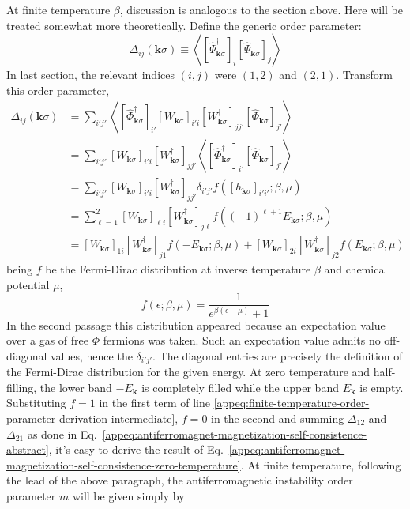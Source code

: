 At finite temperature $\beta$, discussion is analogous to the section above. Here will be treated somewhat more theoretically. Define the generic order parameter:
\[
	\Delta_{ij} (\mathbf{k}\sigma) \equiv \left\langle
		[
			\hat \Psi_{\mathbf{k}\sigma}^\dagger
		]_i [
			\hat \Psi_{\mathbf{k}\sigma}
		]_j
	\right\rangle
\]
In last section, the relevant indices $(i,j)$ were $(1,2)$ and $(2,1)$. Transform this order parameter,
\begin{align}
	\Delta_{ij} (\mathbf{k}\sigma) &= \sum_{i'j'} \left\langle
		[
			\hat \Phi_{\mathbf{k}\sigma}^\dagger
		]_{i'} 
		[
			W_{\mathbf{k}\sigma}
		]_{i'i} [
			W_{\mathbf{k}\sigma}^\dagger
		]_{jj'}
		[
			\hat \Phi_{\mathbf{k}\sigma}
		]_{j'}
	\right\rangle \nonumber \\
	&= 
	\sum_{i'j'} [
		W_{\mathbf{k}\sigma}
	]_{i'i} [
		W_{\mathbf{k}\sigma}^\dagger
	]_{jj'}
	\left\langle
		[
			\hat \Phi_{\mathbf{k}\sigma}^\dagger
		]_{i'} 
		[
			\hat \Phi_{\mathbf{k}\sigma}
		]_{j'}
	\right\rangle \nonumber \\
	&= 
	\sum_{i'j'} [
		W_{\mathbf{k}\sigma}
	]_{i'i} [
		W_{\mathbf{k}\sigma}^\dagger
	]_{jj'}
	\delta_{i'j'} f\left(
		[h_{\mathbf{k}\sigma}]_{i'i'}; \beta,\mu
	\right) \nonumber \\
	&= 
	\sum_{\ell=1}^2 [
		W_{\mathbf{k}\sigma}
	]_{\ell i} [
		W_{\mathbf{k}\sigma}^\dagger
	]_{j\ell}
	f\left(
		(-1)^{\ell+1} E_{\mathbf{k}\sigma}; \beta,\mu
	\right) \nonumber \\
	&= 
	[
		W_{\mathbf{k}\sigma}
	]_{1 i} [
		W_{\mathbf{k}\sigma}^\dagger
	]_{j 1} f\left(
		-E_{\mathbf{k}\sigma}; \beta,\mu
	\right) + [
		W_{\mathbf{k}\sigma}
	]_{2 i} [
		W_{\mathbf{k}\sigma}^\dagger
	]_{j 2} f\left(
		E_{\mathbf{k}\sigma}; \beta,\mu
	\right) \label{appeq:finite-temperature-order-parameter-derivation-intermediate}
\end{align}
being $f$ be the Fermi-Dirac distribution at inverse temperature $\beta$ and chemical potential $\mu$,
\[
	f(\epsilon;\beta,\mu) = \frac{1}{e^{\beta(\epsilon-\mu)}+1} 
\]
In the second passage this distribution appeared because an expectation value over a gas of free $\Phi$ fermions was taken. Such an expectation value admits no off-diagonal values, hence the $\delta_{i'j'}$. The diagonal entries are precisely the definition of the Fermi-Dirac distribution for the given energy. At zero temperature and half-filling, the lower band $-E_\mathbf{k}$ is completely filled while the upper band $E_\mathbf{k}$ is empty. Substituting $f=1$ in the first term of line \eqref{appeq:finite-temperature-order-parameter-derivation-intermediate}, $f=0$ in the second and summing $\Delta_{12}$ and $\Delta_{21}$ as done in Eq.~\eqref{appeq:antiferromagnet-magnetization-self-consistence-abstract}, it's easy to derive the result of Eq.~\eqref{appeq:antiferromagnet-magnetization-self-consistence-zero-temperature}. At finite temperature, following the lead of the above paragraph, the antiferromagnetic instability order parameter $m$ will be given simply by
